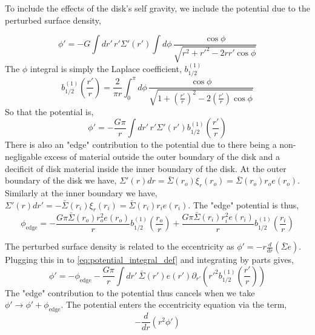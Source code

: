 \documentclass[apj]{emulateapj}
\begin{document}
To include the effects of the disk's self gravity, we include the potential due to the perturbed surface density,

\begin{equation}
\phi' = - G \int dr' \, r' \Sigma'(r') \int d\phi \, \frac{\cos \phi}{\sqrt{ r^2 + r'^2 - 2 r r' \cos \phi}}
\end{equation}
The $\phi$ integral is simply the Laplace coefficient, $b_{1/2}^{(1)}$
\begin{equation}
b_{1/2}^{(1)} \left( \frac{ r'}{r} \right) = \frac{2}{\pi r} \int_0^\pi d\phi \,  \frac{\cos \phi}{\sqrt{1 + \left( \frac{r'}{r} \right)^2  - 2{\left( \frac{r'}{r} \right) \cos \phi}}}
\end{equation}
So that the potential is, 
\begin{equation} \label{eq:potential_integral_def}
\phi' = - \frac{ G \pi}{r} \int dr' \, r' \Sigma'(r') b_{1/2}^{(1)} \left( \frac{r'}{r} \right)
\end{equation}
There is also an "edge" contribution to the potential due to there being a non-negligable excess of material outside the outer boundary of the disk and a decificit of disk material inside the inner boundary of the disk. At the outer boundary of the disk we have, $\Sigma'(r) dr = \bar{\Sigma}(r_o) \xi_r(r_o) = \bar{\Sigma}(r_o) r_o e(r_o)$. Similarly at the inner boundary we have, $\Sigma'(r) dr' = - \bar{\Sigma}(r_i) \xi_r(r_i) = \bar{\Sigma}(r_i) r_i e(r_i)$. The "edge" potential is thus, 
\begin{equation}
\phi_\text{edge} = - \frac{G\pi \bar{\Sigma}(r_o) r_o^2 e(r_o)}{r}   b_{1/2}^{(1)} \left( \frac{r_o}{r} \right)  + \frac{G\pi \bar{\Sigma}(r_i) r_i^2 e(r_i)}{r}   b_{1/2}^{(1)} \left( \frac{r_i}{r} \right)
\end{equation}


The perturbed surface density is related to the eccentricity as $\phi' = - r \frac{d}{dr} \left( \bar{\Sigma} e \right)$. Plugging this in to \eqref{eq:potential_integral_def} and integrating by parts gives, 
\begin{equation}
\phi' = -\phi_\text{edge} - \frac{G \pi}{r} \int dr' \,  \bar{\Sigma}(r') e(r') \partial_{r'} \left( r'^2 b_{1/2}^{(1)} \left( \frac{r'}{r} \right) \right)
\end{equation}
The "edge" contribution to the potential thus cancels when we take $\phi' \rightarrow \phi' + \phi_\text{edge}$. The potential enters the eccentricity equation via the term,
\begin{equation}
- \frac{d}{dr} \left( r^2 \phi' \right)
\end{equation}
\end{document}

